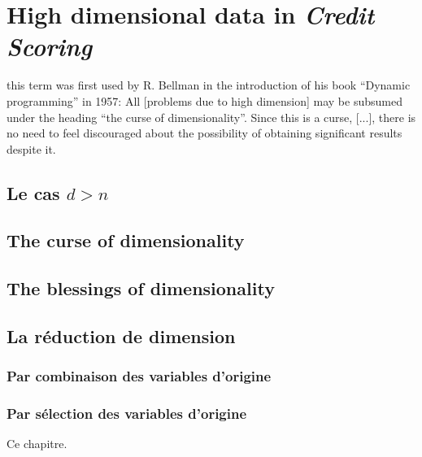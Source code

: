 \chapter{High dimensional data in \textit{Credit Scoring}} \label{chap7}

\minitoc

this term was first used by R. Bellman in the introduction of his book
“Dynamic programming” in 1957:
All [problems due to high dimension] may be subsumed under the
heading “the curse of dimensionality”. Since this is a curse, [...], there is
no need to feel discouraged about the possibility of obtaining significant
results despite it.
















\section{Le cas $d > n$}


\section{The curse of dimensionality}


\section{The blessings of dimensionality}


\section{La réduction de dimension}


\subsection{Par combinaison des variables d'origine}

\subsection{Par sélection des variables d'origine}


\bigskip

Ce chapitre.


\printbibliography[heading=subbibliography, title=Références du chapitre 6]